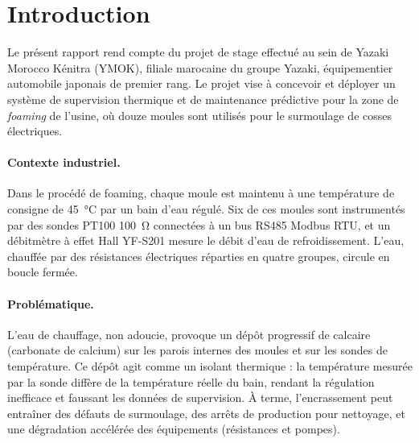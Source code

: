 \section*{Introduction}

Le présent rapport rend compte du projet de stage effectué au sein de Yazaki Morocco Kénitra (YMOK), filiale marocaine du groupe Yazaki, équipementier automobile japonais de premier rang. Le projet vise à concevoir et déployer un système de supervision thermique et de maintenance prédictive pour la zone de \textit{foaming} de l'usine, où douze moules sont utilisés pour le surmoulage de cosses électriques.

\paragraph{Contexte industriel.}
Dans le procédé de foaming, chaque moule est maintenu à une température de consigne de \SI{45}{\celsius} par un bain d'eau régulé. Six de ces moules sont instrumentés par des sondes PT100 \SI{100}{\ohm} connectées à un bus RS485 Modbus RTU, et un débitmètre à effet Hall YF-S201 mesure le débit d'eau de refroidissement. L'eau, chauffée par des résistances électriques réparties en quatre groupes, circule en boucle fermée.

\paragraph{Problématique.}
L'eau de chauffage, non adoucie, provoque un dépôt progressif de calcaire (carbonate de calcium) sur les parois internes des moules et sur les sondes de température. Ce dépôt agit comme un isolant thermique : la température mesurée par la sonde diffère de la température réelle du bain, rendant la régulation inefficace et faussant les données de supervision. À terme, l'encrassement peut entraîner des défauts de surmoulage, des arrêts de production pour nettoyage, et une dégradation accélérée des équipements (résistances et pompes).

